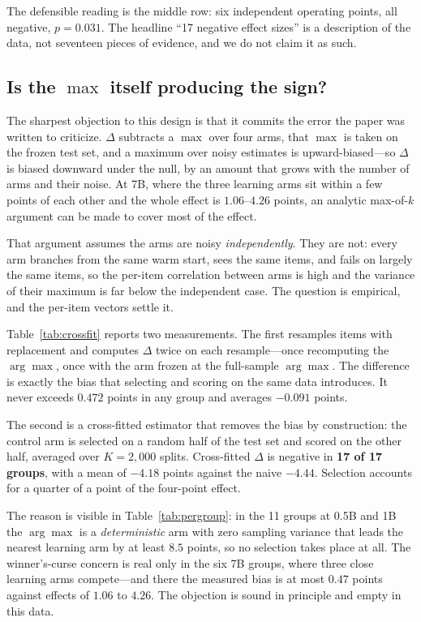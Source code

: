 The defensible reading is the middle row: six independent operating points,
all negative, $p = 0.031$. The headline ``17 negative effect sizes'' is a
description of the data, not seventeen pieces of evidence, and we do not claim
it as such.

\subsection{Is the $\max$ itself producing the sign?}

The sharpest objection to this design is that it commits the error the paper
was written to criticize. $\Delta$ subtracts a $\max$ over four arms, that
$\max$ is taken on the frozen test set, and a maximum over noisy estimates is
upward-biased---so $\Delta$ is biased downward under the null, by an amount
that grows with the number of arms and their noise. At 7B, where the three
learning arms sit within a few points of each other and the whole effect is
$1.06$--$4.26$ points, an analytic max-of-$k$ argument can be made to cover
most of the effect.

That argument assumes the arms are noisy \emph{independently}. They are not:
every arm branches from the same warm start, sees the same items, and fails on
largely the same items, so the per-item correlation between arms is high and
the variance of their maximum is far below the independent case. The question
is empirical, and the per-item vectors settle it.



Table~\ref{tab:crossfit} reports two measurements. The first resamples items
with replacement and computes $\Delta$ twice on each resample---once
recomputing the $\arg\max$, once with the arm frozen at the full-sample
$\arg\max$. The difference is exactly the bias that selecting and scoring on
the same data introduces. It never exceeds $0.472$ points in any group and
averages $-0.091$ points.

The second is a cross-fitted estimator that removes the bias by construction:
the control arm is selected on a random half of the test set and scored on the
other half, averaged over $K = 2{,}000$ splits. Cross-fitted $\Delta$ is
negative in \textbf{17 of 17 groups}, with a mean of $-4.18$ points against the
naive $-4.44$. Selection accounts for a quarter of a point of the four-point
effect.

The reason is visible in Table~\ref{tab:pergroup}: in the 11 groups at 0.5B and
1B the $\arg\max$ is a \emph{deterministic} arm with zero sampling variance
that leads the nearest learning arm by at least $8.5$ points, so no selection
takes place at all. The winner's-curse concern is real only in the six 7B
groups, where three close learning arms compete---and there the measured bias
is at most $0.47$ points against effects of $1.06$ to $4.26$. The objection is
sound in principle and empty in this data.

